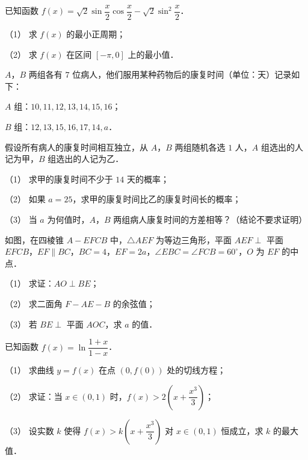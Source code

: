\begin{question}
已知函数 \(f(x)=\sqrt{2}\sin\dfrac{x}{2}\cos\dfrac{x}{2}-\sqrt{2}\sin^{2}\dfrac{x}{2}\)．

（1） 求 \(f(x)\) 的最小正周期；

（2） 求 \(f(x)\) 在区间 \([-\pi,0]\) 上的最小值．

\end{question}
\begin{question}
\(A\)，\(B\) 两组各有 \(7\) 位病人，他们服用某种药物后的康复时间（单位：天）记录如下：

\(A\) 组：\(10, 11, 12, 13, 14, 15, 16\)；

\(B\) 组：\(12, 13, 15, 16, 17, 14, a\)．

假设所有病人的康复时间相互独立，从 \(A\)，\(B\) 两组随机各选 \(1\) 人，\(A\) 组选出的人记为甲，\(B\) 组选出的人记为乙．

（1） 求甲的康复时间不少于 \(14\) 天的概率；

（2） 如果 \(a=25\)，求甲的康复时间比乙的康复时间长的概率；

（3） 当 \(a\) 为何值时，\(A\)，\(B\) 两组病人康复时间的方差相等？（结论不要求证明）

\Needspace{0.4\textheight}
\end{question}
\begin{question}
如图，在四棱锥 \(A-EFCB\) 中，\(\triangle AEF\) 为等边三角形，平面 \(AEF\perp\) 平面 \(EFCB\)，\(EF\parallel BC\)，\(BC=4\)，\(EF=2a\)，\(\angle EBC=\angle FCB=60^\circ\)，\(O\) 为 \(EF\) 的中点．
\nopagebreak[4]
\begin{center}\end{center}
\nopagebreak[4]
（1） 求证：\(AO\perp BE\)；

（2） 求二面角 \(F-AE-B\) 的余弦值；

（3） 若 \(BE\perp\) 平面 \(AOC\)，求 \(a\) 的值．

\end{question}
\begin{question}
已知函数 \(f(x)=\ln\dfrac{1+x}{1-x}\)．

（1） 求曲线 \(y=f(x)\) 在点 \((0,f(0))\) 处的切线方程；

（2） 求证：当 \(x\in(0,1)\) 时，\(f(x)>2\left(x+\dfrac{x^{3}}{3}\right)\)；

（3） 设实数 \(k\) 使得 \(f(x)>k\left(x+\dfrac{x^{3}}{3}\right)\) 对 \(x\in(0,1)\) 恒成立，求 \(k\) 的最大值．

\end{question}

